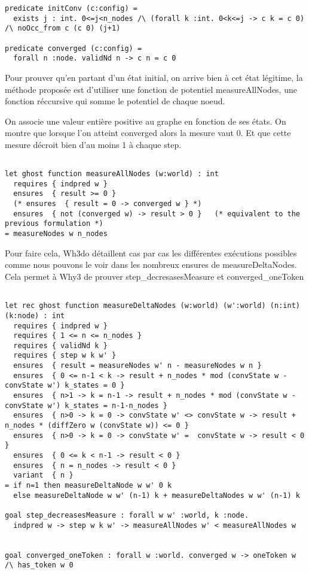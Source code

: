 \documentclass[11pt]{article}
\begin{document}
\lstset{language=why3,label= ,caption= ,captionpos=b,numbers=none}
\begin{lstlisting}
predicate initConv (c:config) =
  exists j : int. 0<=j<n_nodes /\ (forall k :int. 0<k<=j -> c k = c 0) /\ noOcc_from c (c 0) (j+1)

predicate converged (c:config) =
  forall n :node. validNd n -> c n = c 0

\end{lstlisting}


Pour prouver qu'en partant d'un état initial, on arrive bien à cet état légitime, 
la méthode proposée est d'utiliser une fonction de potentiel measureAllNodes,
une fonction réccursive qui somme le potentiel de chaque noeud.



On associe une valeur entière positive au graphe en fonction de ses états.
On montre que lorsque l'on atteint converged alors la mesure vaut 0. 
Et que cette mesure décroit bien d'au moins 1 à chaque step. 


\lstset{language=why3,label= ,caption= ,captionpos=b,numbers=none}
\begin{lstlisting}

let ghost function measureAllNodes (w:world) : int
  requires { indpred w }
  ensures  { result >= 0 }
  (* ensures  { result = 0 -> converged w } *)
  ensures  { not (converged w) -> result > 0 }   (* equivalent to the previous formulation *)
= measureNodes w n_nodes

\end{lstlisting}

Pour faire cela, Wh3do détaillent cas par cas les différentes exécutions possibles  comme nous
pouvons le voir dans les nombreux ensures de measureDeltaNodes. 
Cela permet à Why3 de prouver step\_decresasesMeasure et converged\_oneToken

\lstset{language=why3,label= ,caption= ,captionpos=b,numbers=none}
\begin{lstlisting}

let rec ghost function measureDeltaNodes (w:world) (w':world) (n:int) (k:node) : int
  requires { indpred w }
  requires { 1 <= n <= n_nodes }
  requires { validNd k }
  requires { step w k w' }
  ensures  { result = measureNodes w' n - measureNodes w n }
  ensures  { 0 <= n-1 < k -> result + n_nodes * mod (convState w - convState w') k_states = 0 }
  ensures  { n>1 -> k = n-1 -> result + n_nodes * mod (convState w - convState w') k_states = n-1-n_nodes }
  ensures  { n>0 -> k = 0 -> convState w' <> convState w -> result + n_nodes * (diffZero w (convState w)) <= 0 }
  ensures  { n>0 -> k = 0 -> convState w' =  convState w -> result < 0 }
  ensures  { 0 <= k < n-1 -> result < 0 }
  ensures  { n = n_nodes -> result < 0 }
  variant  { n }
= if n=1 then measureDeltaNode w w' 0 k
  else measureDeltaNode w w' (n-1) k + measureDeltaNodes w w' (n-1) k

goal step_decreasesMeasure : forall w w' :world, k :node.
  indpred w -> step w k w' -> measureAllNodes w' < measureAllNodes w


goal converged_oneToken : forall w :world. converged w -> oneToken w /\ has_token w 0

\end{lstlisting}
\end{document}
